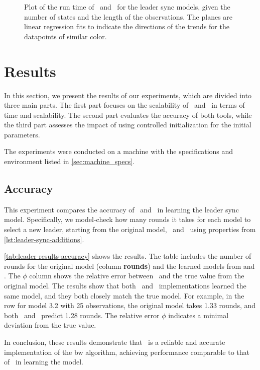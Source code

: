 \begin{figure*}
    \centering
    
    \caption{Plot of the run time of \Jajapy\ and \Cupaal\ for the leader sync models, given the number of states and the length of the observations. The planes are linear regression fits to indicate the directions of the trends for the datapoints of similar color.}
    \label{fig:leader_results}
\end{figure*}


\section{Results}\label{sec:results}
In this section, we present the results of our experiments, which are divided into three main parts. The first part focuses on the scalability of \Jajapy\ and \Cupaal\ in terms of time and scalability.
The second part evaluates the accuracy of both tools, while the third part assesses the impact of using controlled initialization for the initial parameters.

The experiments were conducted on a machine with the specifications and environment listed in \autoref{sec:machine_specs}.

\subsection{Accuracy}\label{subsec:accuracy}
This experiment compares the accuracy of \Cupaal\ and \Jajapy\ in learning the leader sync model. Specifically, we model-check how many rounds it takes for each model to select a new leader, starting from the original model, \Jajapy\ and \Cupaal\, using properties from \autoref{lst:leader-sync-additions}.

\autoref{tab:leader-results-accuracy} shows the results. The table includes the number of rounds for the original model (column \textbf{rounds}) and the learned models from \Jajapy and \Cupaal.
The $\phi$ column shows the relative error between \Jajapy\ and the true value from the original model.
The results show that both \Cupaal\ and \Jajapy\  implementations learned the same model, and they both closely match the true model. For example, in the row for model 3.2 with 25 observations, the original model takes 1.33 rounds, and both \Cupaal\ and \Jajapy\  predict 1.28 rounds.
The relative error $\phi$ indicates a minimal deviation from the true value.

In conclusion, these results demonstrate that \Cupaal\ is a reliable and accurate implementation of the \gls{bw} algorithm, achieving performance comparable to that of \Jajapy\ in learning the model.

